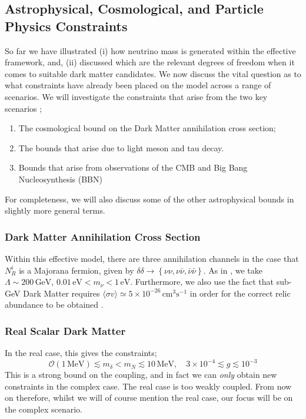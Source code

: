\documentclass[11pt]{article}
\numberwithin{equation}{section}
\numberwithin{figure}{section}
\numberwithin{table}{section}
\newcommand{\mO}{\mathcal{O}}
\newcommand{\set}[1]{\left\{#1\right\}}
\begin{document}
\subsection{Astrophysical, Cosmological, and Particle Physics Constraints}




So far we have illustrated (i) how neutrino mass is generated within the effective framework, and, (ii) discussed which are the relevant degrees of freedom when it comes to suitable dark matter candidates. We now discuss the vital question as to what constraints have already been placed on the model across a range of scenarios. We will investigate the constraints that arise from the two key scenarios \cite{Boehm2006, Franarin2018, Farzan2009, Farzan2011, Farzan2014, Farzan2010};
\begin{enumerate}
  \item The cosmological bound on the Dark Matter annihilation cross section;
  \item The bounds that arise due to light meson and tau decay.
  \item Bounds that arise from observations of the CMB and Big Bang Nucleosynthesis (BBN)
\end{enumerate}
For completeness, we will also discuss some of the other astrophysical bounds in slightly more general terms.
\subsubsection{Dark Matter Annihilation Cross Section}
Within this effective model, there are three annihilation channels in the case that $N^i_R$ is a Majorana fermion, given by $\delta \delta \rightarrow \set{\nu\nu, \nu\bar{\nu}, \bar{\nu}\bar{\nu}}$. As in \cite{Boehm2006}, we take $\Lambda \sim 200 \, \text{GeV}$, $0.01 \, \text{eV} < m_\nu < 1\, \text{eV}$. Furthermore, we also use the fact that sub-GeV Dark Matter requires $\langle \sigma v \rangle \simeq 5 \times 10^{-26}\, \text{cm}^3\text{s}^{-1}$ in order for the correct relic abundance to be obtained \cite{Steigman2012}.
\subsubsection*{Real Scalar Dark Matter}
In the real case, this gives the constraints;
\begin{equation}
  \mO(1 \, \text{MeV}) \lesssim m_\delta < m_N \lesssim 10 \, \text{MeV}, \quad 3 \times 10^{-4} \lesssim g \lesssim 10^{-3}
\end{equation}
\noindent This is a strong bound on the coupling, and in fact we can \emph{only} obtain new constraints in the complex case. The real case is too weakly coupled. From now on therefore, whilst we will of course mention the real case, our focus will be on the complex scenario.
\end{document}
